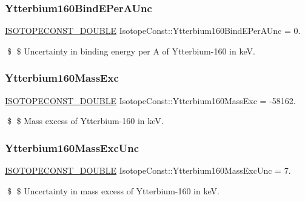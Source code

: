 \subsubsection{\texorpdfstring{Ytterbium160\+Bind\+E\+Per\+A\+Unc}{Ytterbium160BindEPerAUnc}}
{\footnotesize\ttfamily \mbox{\hyperlink{group___isotope_const-_macros_ga8f45a7272ce02c0b4c65c44636ed719a}{I\+S\+O\+T\+O\+P\+E\+C\+O\+N\+S\+T\+\_\+\+D\+O\+U\+B\+LE}} Isotope\+Const\+::\+Ytterbium160\+Bind\+E\+Per\+A\+Unc = 0.}

\$ \$ Uncertainty in binding energy per A of Ytterbium-\/160 in keV. \mbox{\label{group___isotope_const-_ytterbium-_yb160_ga539b09cb10f2938ecec7c2fa715cd742}} 
\subsubsection{\texorpdfstring{Ytterbium160\+Mass\+Exc}{Ytterbium160MassExc}}
{\footnotesize\ttfamily \mbox{\hyperlink{group___isotope_const-_macros_ga8f45a7272ce02c0b4c65c44636ed719a}{I\+S\+O\+T\+O\+P\+E\+C\+O\+N\+S\+T\+\_\+\+D\+O\+U\+B\+LE}} Isotope\+Const\+::\+Ytterbium160\+Mass\+Exc = -\/58162.}

\$ \$ Mass excess of Ytterbium-\/160 in keV. \mbox{\label{group___isotope_const-_ytterbium-_yb160_ga4eec666b8d1ba6c9259f763f81490bf4}} 
\subsubsection{\texorpdfstring{Ytterbium160\+Mass\+Exc\+Unc}{Ytterbium160MassExcUnc}}
{\footnotesize\ttfamily \mbox{\hyperlink{group___isotope_const-_macros_ga8f45a7272ce02c0b4c65c44636ed719a}{I\+S\+O\+T\+O\+P\+E\+C\+O\+N\+S\+T\+\_\+\+D\+O\+U\+B\+LE}} Isotope\+Const\+::\+Ytterbium160\+Mass\+Exc\+Unc = 7.}

\$ \$ Uncertainty in mass excess of Ytterbium-\/160 in keV. \mbox{\label{group___isotope_const-_ytterbium-_yb160_gae416237763b373c41687beda01506bbc}} 
